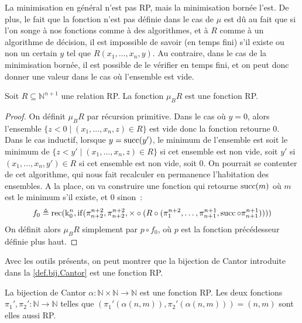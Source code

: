 La minimisation en général n'est pas RP, mais la minimisation bornée l'est. De
plus, le fait que la fonction n'est pas définie dans le cas de $\mu$ est dû
au fait que si l'on songe à nos fonctions comme à des algorithmes, et à $R$
comme à un algorithme de décision, il est impossible de savoir (en temps fini)
s'il existe ou non un certain $y$ tel que $R(x_1,\ldots,x_n,y)$. Au contraire,
dans le cas de la minimisation bornée, il est possible de le vérifier en temps
fini, et on peut donc donner une valeur dans le cas où l'ensemble est vide.

\begin{proposition}
  Soit $R\subseteq \mathbb N^{n+1}$ une relation RP. La fonction $\mu_B R$ est
  une fonction RP.
\end{proposition}

\begin{proof}
  On définit $\mu_B R$ par récursion primitive. Dans le cas où $y = 0$, alors
  l'ensemble $\{ z < 0 \mid (x_1,\ldots,x_n,z) \in R\}$ est vide donc la
  fonction retourne $0$. Dans le cas inductif, lorsque $y = \operatorname{succ}(y')$, le
  minimum de l'ensemble est soit le minimum de
  $\{ z < y' \mid (x_1,\ldots,x_n,z)\in R\}$ si cet ensemble est non vide, soit
  $y'$ si $(x_1,\ldots,x_n,y') \in R$ si cet ensemble est non vide, soit $0$. On
  pourrait se contenter de cet algorithme, qui nous fait recalculer en
  permanence l'habitation des ensembles. A la place, on va construire une
  fonction qui retourne $\operatorname{succ}(m)$ où $m$ est le minimum s'il existe, et $0$
  sinon~:
  \[f_0 \triangleq \operatorname{rec}(\operatorname{k}_0^n,\operatorname{if}(\pi_{n+2}^{n+2},\pi_{n+2}^{n+2},
  \times\circ(R\circ(\pi_1^{n+2},\ldots,\pi_{n+1}^{n+1},
  \operatorname{succ}\circ \pi_{n+1}^{n+1}))))\]
  On définit alors $\mu_B R$ simplement par $p\circ f_0$, où $p$ est la
  fonction précédesseur définie plus haut.
\end{proof}

Avec les outils présents, on peut montrer que la bijection de Cantor introduite
dans la \cref{def.bij.Cantor} est une fonction RP.

\begin{proposition}
  La bijection de Cantor $\alpha : \mathbb N \times \mathbb N \to \mathbb N$
  est une fonction RP. Les deux fonctions
  $\pi_1',\pi_2' : \mathbb N \to \mathbb N$ telles que
  $(\pi_1'(\alpha(n,m)),\pi_2'(\alpha(n,m))) = (n,m)$ sont elles aussi RP.
\end{proposition}

